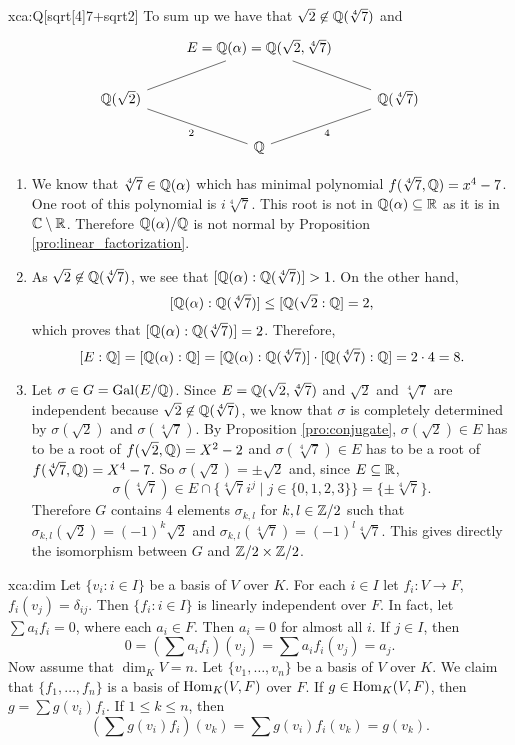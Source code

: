 \begin{sol}{xca:Q[sqrt[4]{7}+sqrt{2}]}
To sum up we have that $\sqrt{2}\not\in \mathbb{Q}(\sqrt[4]{7})$ and
\[
\begin{tikzcd}
	& {E=\Q(\alpha)=\Q(\sqrt{2},\sqrt[4]{7})}\arrow[rd,no head]\\
	{\Q(\sqrt{2})}\arrow[ru,no head,]&& {\Q(\sqrt[4]{7})}\arrow[ld,no head,"4"]  \\
	& {\Q}\arrow[lu,no head,"2"] 
 \end{tikzcd}
\]
\begin{enumerate}
    \item We know that $\sqrt[4]{7} \in \mathbb{Q}(\alpha)$ 
    which has minimal polynomial $f(\sqrt[4]{7},\mathbb{Q}) = x^4-7$.
    One root of this polynomial is $i\sqrt[4]{7}$.
    This root is not in $\mathbb{Q}(\alpha)\subseteq \mathbb{R}$ as it is in $\mathbb{C}\setminus\mathbb{R}$. 
    Therefore $\mathbb{Q}(\alpha)/\mathbb{Q}$ is not normal by Proposition \ref{pro:linear_factorization}.
    \item  As $\sqrt{2} \not\in \mathbb{Q}(\sqrt[4]{7})$,
    we see that $[\mathbb{Q}(\alpha):\mathbb{Q}(\sqrt[4]{7})] > 1$.
    On the other hand, 
    $$[\mathbb{Q}(\alpha):\mathbb{Q}(\sqrt[4]{7})] \leq [\mathbb{Q}(\sqrt{2}:\mathbb{Q}]=2,$$
    which proves that $[\mathbb{Q}(\alpha):\mathbb{Q}(\sqrt[4]{7})] = 2$.
    Therefore,
    \[
     [E:\mathbb{Q}]=[\mathbb{Q}(\alpha):\mathbb{Q}] = [\mathbb{Q}(\alpha):\mathbb{Q}(\sqrt[4]{7})] \cdot [\mathbb{Q}(\sqrt[4]{7}): \mathbb{Q}] = 2 \cdot 4 = 8.
    \]
    \item Let $\sigma\in G=\operatorname{Gal}(E/\mathbb{Q})$.
    Since $E=\mathbb{Q}(\sqrt{2},\sqrt[4]{7})$ and 
    $\sqrt{2}$ and $\sqrt[4]{7}$ are independent 
    because $\sqrt{2}\not\in \mathbb{Q}(\sqrt[4]{7})$,
    we know that $\sigma$ is completely determined
    by $\sigma(\sqrt{2})$ and $\sigma(\sqrt[4]{7})$.
    By Proposition \ref{pro:conjugate},
    $\sigma(\sqrt{2})\in E$ has to be a root of $f(\sqrt{2},\mathbb{Q})=X^2-2$ 
    and $\sigma(\sqrt[4]{7})\in E$ has to be a root of $f(\sqrt[4]{7},\mathbb{Q})=X^4-7$.
    So $\sigma(\sqrt{2})=\pm\sqrt{2}$ and, since $E\subseteq \mathbb{R}$,
    $$\sigma(\sqrt[4]{7})\in E\cap\{\sqrt[4]{7}i^j\mid j\in\{0,1,2,3\}\}=\{\pm\sqrt[4]{7}\}.$$
    Therefore $G$ contains 4 elements $\sigma_{k,l}$ for $k,l\in \mathbb{Z}/2$
    such that $\sigma_{k,l}(\sqrt{2})=(-1)^k\sqrt{2}$ 
    and $\sigma_{k,l}(\sqrt[4]{7})=(-1)^l\sqrt[4]{7}$.
    This gives directly the isomorphism between $G$ and $\mathbb{Z}/2\times\mathbb{Z}/2$. 
\end{enumerate}
\end{sol}



\begin{sol}{xca:dim}
 Let $\{v_i:i\in I\}$ be a basis of $V$ over $K$. For each $i\in I$
 let $f_i\colon V\to F$, $f_i(v_j)=\delta_{ij}$. Then $\{f_i:i\in I\}$ is linearly 
 independent over $F$. In fact, let 
 $\sum a_if_i=0$, where each $a_i\in F$. Then 
 $a_i=0$ for almost all $i$. If $j\in I$, then 
 \[
 0=\left(\sum a_if_i\right)(v_j)=\sum a_if_i(v_j)=a_j.
 \]
 Now assume that $\dim_KV=n$. Let $\{v_1,\dots,v_n\}$ be a basis of $V$ over $K$.
 We claim that $\{f_1,\dots,f_n\}$ is a basis of $\operatorname{Hom}_K(V,F)$ over $F$. If 
 $g\in\operatorname{Hom}_K(V,F)$, then $g=\sum g(v_i)f_i$. If $1\leq k\leq n$, then
 \[
 \left(\sum g(v_i)f_i\right)(v_k)=\sum g(v_i)f_i(v_k)=g(v_k).
 \]
\end{sol}



